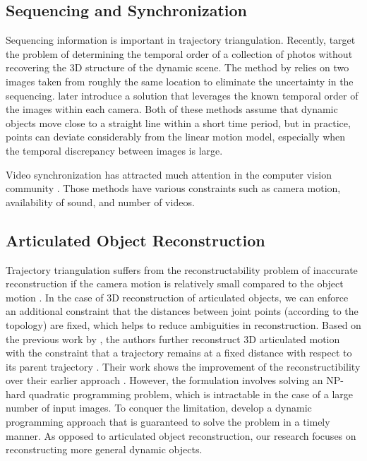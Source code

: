 \subsection{Sequencing and Synchronization}
Sequencing information is important in trajectory triangulation. Recently,
\citet{Basha_ECCV2012, Basha_ICCV2013} target the problem of determining the temporal order of a collection of photos without recovering the 3D structure of the dynamic scene. The method by \citet{Basha_ECCV2012} relies on two images taken from roughly the same location to eliminate the uncertainty in the sequencing. \citet{Basha_ICCV2013} later introduce a solution that leverages the known temporal order of the images within each camera. Both of these methods assume that dynamic objects move close to a straight line within a short time period, but in practice, points can deviate considerably from the linear motion model, especially when the temporal discrepancy between images is large. 

Video synchronization has attracted much attention in the computer vision community \cite{Tuytelaars_CVPR,shrestha2010synchronization,rao2003view}. Those methods have various constraints such as camera motion, availability of sound, and number of videos. 

\subsection{Articulated Object Reconstruction}
Trajectory triangulation suffers from the reconstructability problem of inaccurate reconstruction if the camera motion is relatively small compared to the object motion \cite{park20153d}. 
In the case of 3D reconstruction of articulated objects, we can enforce an additional constraint that the distances between joint points (according to the topology) are fixed, which helps to reduce ambiguities in reconstruction. 
Based on the previous work by \citet{Park_ECCV2010}, the authors further reconstruct 3D articulated motion with the constraint that a trajectory remains at a fixed distance with respect to its parent trajectory \cite{Park_ICCV2011}. Their work shows the improvement of the reconstructibility over their earlier approach \cite{Park_ECCV2010}.
However, the formulation involves solving an NP-hard quadratic programming problem, which is intractable in the case of a large number of input images. 
To conquer the limitation, \citet{Valmadre_ECCV2012} develop a dynamic programming approach that is guaranteed to solve the problem in a timely manner. 
As opposed to articulated object reconstruction, our research focuses on reconstructing more general dynamic objects. 


